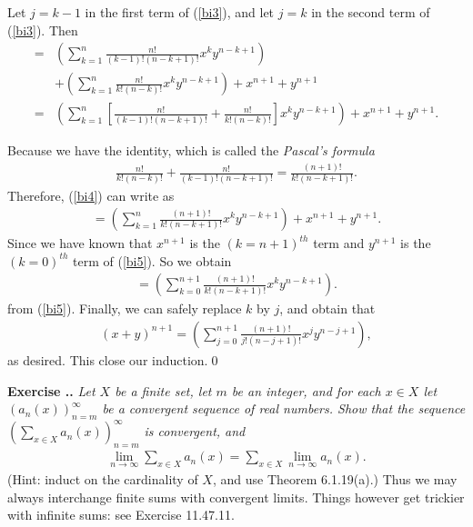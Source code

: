 \documentclass{book}
\newcounter{Exercise}[section]
\renewcommand{\theExercise}{\thesection.\arabic{Exercise}.}
\newcommand{\new}{\vspace{1.5em}\noindent\textbf{{Exercise \stepcounter{Exercise}\textbf{\theExercise}}} }
\begin{document}
    Let $j=k-1$ in the first term of (\ref{bi3}), and let $j=k$ in the second term of (\ref{bi3}). Then
    \begin{align}\label{bi4}
        =&\left(\sum_{k=1}^{n}\frac{n!}{(k-1)!(n-k+1)!}x^{k}y^{n-k+1}\right)\nonumber\\
        &+\left(\sum_{k=1}^n\frac{n!}{k!(n-k)!}x^ky^{n-k+1}\right)+x^{n+1}+y^{n+1}\nonumber\\
        =&\left(\sum_{k=1}^{n}\left[\frac{n!}{(k-1)!(n-k+1)!}+\frac{n!}{k!(n-k)!}\right]x^{k}y^{n-k+1}\right)+x^{n+1}+y^{n+1}.
    \end{align}

Because we have the identity, which is called the \emph{Pascal's formula}
\begin{align*}
    \frac{n!}{k!(n-k)!}+\frac{n!}{(k-1)!(n-k+1)!}=\frac{(n+1)!}{k!(n-k+1)!}.
\end{align*}
Therefore, (\ref{bi4}) can write as
\begin{align}\label{bi5}
    =\left(\sum_{k=1}^{n}\frac{(n+1)!}{k!(n-k+1)!}x^{k}y^{n-k+1}\right)+x^{n+1}+y^{n+1}.
\end{align}
Since we have known that $x^{n+1}$ is the $(k=n+1)^{th}$ term and $y^{n+1}$ is the $(k=0)^{th}$ term of (\ref{bi5}). So we obtain
    \begin{align*}
        =\left(\sum_{k=0}^{n+1}\frac{(n+1)!}{k!(n-k+1)!}x^{k}y^{n-k+1}\right).
    \end{align*}
from (\ref{bi5}). Finally, we can safely replace $k$ by $j$, and obtain that
    \begin{align*}
        (x+y)^{n+1}=\left(\sum_{j=0}^{n+1}\frac{(n+1)!}{j!(n-j+1)!}x^{j}y^{n-j+1}\right),
    \end{align*}
as desired. This close our induction.\qed

\new\emph{Let $X$ be a finite set, let $m$ be an integer, and for each $x\in X$ let $(a_n(x))_{n=m}^\infty$ be a convergent sequence of real numbers. Show that the sequence $(\sum_{x\in X}a_n(x))_{n=m}^\infty$ is convergent, and}
    \begin{align*}
        \lim_{n\to\infty}\sum_{x\in X}a_n(x)=\sum_{x\in X}\lim_{n\to\infty}a_n(x).
    \end{align*}
(Hint: induct on the cardinality of $X$, and use Theorem 6.1.19(a).) Thus we may always interchange finite sums with convergent limits. Things however get trickier with infinite sums: see Exercise 11.47.11.
\end{document}
